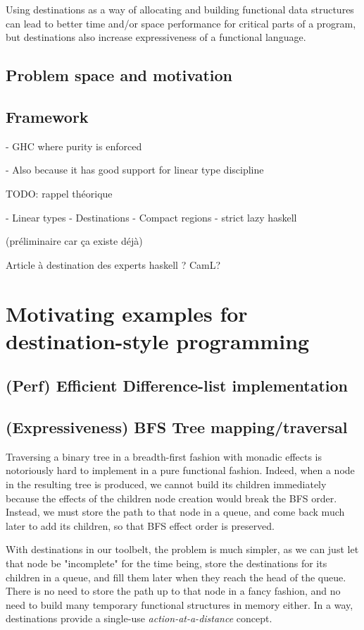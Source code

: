 \documentclass[english]{jflart}
\begin{document}
Using destinations as a way of allocating and building functional data structures can lead to better time and/or space performance for critical parts of a program, but destinations also increase expressiveness of a functional language.

\subsection{Problem space and motivation}

\subsection{Framework}

- GHC where purity is enforced

- Also because it has good support for linear type discipline

TODO: rappel théorique

- Linear types
- Destinations
- Compact regions
- strict lazy haskell

(préliminaire car ça existe déjà)

Article à destination des experts haskell ? CamL?

\section{Motivating examples for destination-style programming}

\subsection{(Perf) Efficient Difference-list implementation}

\subsection{(Expressiveness) BFS Tree mapping/traversal}

Traversing a binary tree in a breadth-first fashion with monadic effects is notoriously hard to implement in a pure functional fashion. Indeed, when a node in the resulting tree is produced, we cannot build its children immediately because the effects of the children node creation would break the BFS order. Instead, we must store the path to that node in a queue, and come back much later to add its children, so that BFS effect order is preserved.

With destinations in our toolbelt, the problem is much simpler, as we can just let that node be "incomplete" for the time being, store the destinations for its children in a queue, and fill them later when they reach the head of the queue. There is no need to store the path up to that node in a fancy fashion, and no need to build many temporary functional structures in memory either. In a way, destinations provide a single-use \emph{action-at-a-distance} concept.
\end{document}
